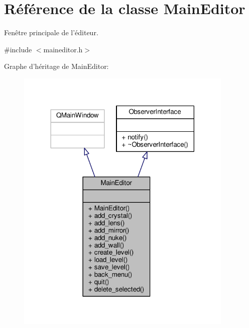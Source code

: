 \hypertarget{classMainEditor}{\section{Référence de la classe Main\+Editor}
\label{classMainEditor}
}


Fenêtre principale de l’éditeur.  




{\ttfamily \#include $<$maineditor.\+h$>$}



Graphe d'héritage de Main\+Editor\+:\nopagebreak
\begin{figure}[H]
\begin{center}
\leavevmode
\includegraphics[width=294pt]{d1/d27/classMainEditor__inherit__graph}
\end{center}
\end{figure}


